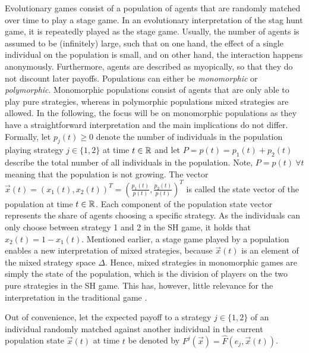 \label{sec:evolutionarystaghunt}
Evolutionary games consist of a population of agents that are randomly matched 
over time to play a stage game. In an evolutionary interpretation of the
stag hunt game, it is repeatedly played as the stage game.
Usually, the number of agents is assumed to be (infinitely) large, 
such that on one hand, the effect of a single individual 
on the population is small, and on 
other hand, the interaction happens anonymously.
Furthermore, agents are described as myopically, so that they do not 
discount later payoffs.
Populations can either be \textit{monomorphic} or \textit{polymorphic}.
Monomorphic populations consist of agents that are only able to play pure
strategies, whereas in polymorphic populations mixed strategies are allowed.
In the following, the focus will be on monomorphic populations as they have
a straightforward interpretation and the main implications do not differ. 
Formally, let $p_j(t) \geq 0$ denote the number of individuals in 
the population playing strategy $j \in \{1,2\}$ at time $t \in \mathbb{R}$ and 
let $P = p(t) = p_1(t) + p_2(t)$ describe the total number of all individuals 
in the population. Note, $P =p(t)\ \forall t$ meaning that the population 
is not growing. The vector $\vec{x}(t) = \left(x_1(t),x_2(t)\right)^T
=\left(\frac{p_1(t)}{p(t)},\frac{p_2(t)}{p(t)}\right)^T$ is called the state 
vector of the population at time $t \in \mathbb{R}$. 
Each component of the population state vector represents the share of agents 
choosing a specific strategy. As the individuals can only choose between 
strategy 1 and 2 in the SH game, it holds that  $x_2(t) = 1-x_1(t)$. 
Mentioned earlier, a stage game played by a population enables a 
new interpretation of mixed strategies, because $\vec{x}(t)$ is an 
element of the mixed strategy space $\Delta$.
Hence, mixed strategies in monomorphic games are simply the state
of the population, which is the division of players on the two
pure strategies in the SH game. 
This has, however, little relevance for the interpretation
in the traditional game \parencite[914-915]{rubinstein_comments_1991}.

Out of convenience, let the expected payoff 
to a strategy $j \in \{1,2\}$ of an individual randomly matched
against another individual in the current population state $\vec{x}(t)$ 
at time $t$ be denoted by $F^j(\vec{x}) = \hat{F}(e_j,\vec{x}(t))$. 

